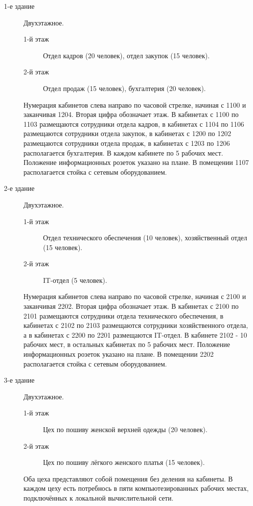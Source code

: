 \begin{description}
\item [1-е здание]
  Двухэтажное.
  \begin{description} 
  \item[1-й этаж]
    Отдел кадров (20 человек), отдел закупок (15 человек).
  \item[2-й этаж]
    Отдел продаж (15 человек), бухгалтерия (20 человек).
  \end{description}
  Нумерация кабинетов слева направо по часовой стрелке, начиная с 1100 и заканчивая 1204. Вторая цифра обозначает этаж. В кабинетах с 1100 по 1103 размещаются сотрудники отдела кадров, в кабинетах с 1104 по 1106 размещаются сотрудники отдела закупок, в кабинетах с 1200 по 1202 размещаются сотрудники отдела продаж, в кабинетах с 1203 по 1206 располагается бухгалтерия. В каждом кабинете по 5 рабочих мест. Положение информационных розеток указано на плане. В помещении 1107 располагается стойка с сетевым оборудованием.
\item [2-е здание]
  Двухэтажное.
  \begin{description}
  \item [1-й этаж]
    Отдел технического обеспечения (10 человек), хозяйственный отдел (15 человек).
  \item[2-й этаж]
    IT-отдел (5 человек).
  \end{description}
  Нумерация кабинетов слева направо по часовой стрелке, начиная с 2100 и заканчивая 2202. Вторая цифра обозначает этаж. В кабинетах с 2100 по 2101 размещаются сотрудники отдела технического обеспечения, в кабинетах с 2102 по 2103 размещаются сотрудники хозяйственного отдела, а в кабинетах с 2200 по 2201 размещаются IT-отдел.
  В кабинете 2102 - 10 рабочих мест, в остальных кабинетах по 5 рабочих мест. Положение информационных розеток указано на плане. В помещении 2202 располагается стойка с сетевым оборудованием.
\item [3-е здание]
  Двухэтажное.
  \begin{description} 
  \item[1-й этаж]
    Цех по пошиву женской верхней одежды (20 человек).
  \item[2-й этаж]
    Цех по пошиву лёгкого женского платья (15 человек).
  \end{description}
  Оба цеха представляют собой помещения без деления на кабинеты. В каждом цеху есть потребнось в пяти компьютезированных рабочих местах, подключённых к  локальной вычислительной сети.
  

\end{description}
